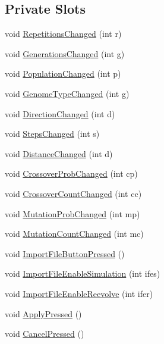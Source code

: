 \subsection*{Private Slots}
\begin{DoxyCompactItemize}
\item 
void \hyperlink{classCWidgetEvolution_a4a2344ac3739e3c9360dd3b1ede65dda}{RepetitionsChanged} (int r)
\item 
void \hyperlink{classCWidgetEvolution_a8a40de3276109d8b03dc02ef42d8961b}{GenerationsChanged} (int g)
\item 
void \hyperlink{classCWidgetEvolution_a1931e0c63052127070ecd8ad86f87530}{PopulationChanged} (int p)
\item 
void \hyperlink{classCWidgetEvolution_a2748148f4fbf4dd9698bde0f9496ae8c}{GenomeTypeChanged} (int g)
\item 
void \hyperlink{classCWidgetEvolution_a3c80054e331df0db4a19ba444a82bd53}{DirectionChanged} (int d)
\item 
void \hyperlink{classCWidgetEvolution_adcbaead4616e9947c5b0697677af0c20}{StepsChanged} (int s)
\item 
void \hyperlink{classCWidgetEvolution_a5e155a1df2cbf7ec7b4e0ac94d8596a2}{DistanceChanged} (int d)
\item 
void \hyperlink{classCWidgetEvolution_a0cf06a851852dd39ce709869188e6abd}{CrossoverProbChanged} (int cp)
\item 
void \hyperlink{classCWidgetEvolution_a813da70b11446896d8b03f2bc7c5eb35}{CrossoverCountChanged} (int cc)
\item 
void \hyperlink{classCWidgetEvolution_aaf76f3b21dc7558b9d488e747409b66a}{MutationProbChanged} (int mp)
\item 
void \hyperlink{classCWidgetEvolution_a26dffc6b20f733569a4b43aa66ffc04a}{MutationCountChanged} (int mc)
\item 
void \hyperlink{classCWidgetEvolution_a2c27b79baf649227eac32b819874eac2}{ImportFileButtonPressed} ()
\item 
void \hyperlink{classCWidgetEvolution_ab404024a3c67b19e74448fc61a96c1af}{ImportFileEnableSimulation} (int ifes)
\item 
void \hyperlink{classCWidgetEvolution_a85d018ad28c22f7b20ecefa82b282313}{ImportFileEnableReevolve} (int ifer)
\item 
void \hyperlink{classCWidgetEvolution_a12c4341a31c05a4311af2de591575845}{ApplyPressed} ()
\item 
void \hyperlink{classCWidgetEvolution_ae8cd94dd178c48cd41e51fd37df02606}{CancelPressed} ()
\end{DoxyCompactItemize}
